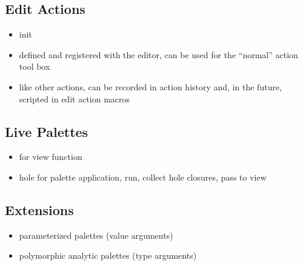 \subsection{Edit Actions}


\begin{itemize}

\item init 

\end{itemize}


\begin{itemize}

\item defined and registered with the editor, can be used for the ``normal''
action tool box

\item like other actions, can be recorded in action history and, in the future,
scripted in edit action macros

\end{itemize}

\subsection{Live Palettes}

\begin{itemize}

\item for view function

\item hole for palette application, run, collect hole closures, pass to view

\end{itemize}

\subsection{Extensions}

\begin{itemize}

\item parameterized palettes (value arguments)

\item polymorphic analytic palettes (type arguments)

\end{itemize}



